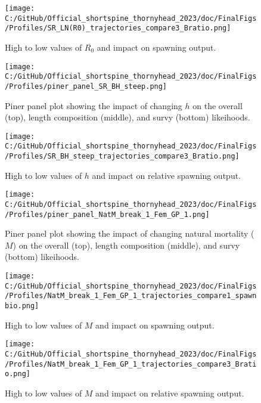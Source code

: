 \documentclass[11pt,
  letterpaper,
]{article}
\begin{document}
\begin{figure}
\centering
\texttt{[image: C:/GitHub/Official\_shortspine\_thornyhead\_2023/doc/FinalFigs/Profiles/SR\_LN(R0)\_trajectories\_compare3\_Bratio.png]}
\caption{High to low values of \(R_0\) and impact on spawning output.\label{fig:R0_spawnout}}
\end{figure}

\begin{figure}
\centering
\texttt{[image: C:/GitHub/Official\_shortspine\_thornyhead\_2023/doc/FinalFigs/Profiles/piner\_panel\_SR\_BH\_steep.png]}
\caption{Piner panel plot showing the impact of changing \(h\) on the overall (top), length composition (middle), and survy (bottom) likeihoods.\label{fig:h_piner_prof}}
\end{figure}

\begin{figure}
\centering
\texttt{[image: C:/GitHub/Official\_shortspine\_thornyhead\_2023/doc/FinalFigs/Profiles/SR\_BH\_steep\_trajectories\_compare3\_Bratio.png]}
\caption{High to low values of \(h\) and impact on relative spawning output.\label{fig:h_spawnout}}
\end{figure}

\begin{figure}
\centering
\texttt{[image: C:/GitHub/Official\_shortspine\_thornyhead\_2023/doc/FinalFigs/Profiles/piner\_panel\_NatM\_break\_1\_Fem\_GP\_1.png]}
\caption{Piner panel plot showing the impact of changing natural mortality (\(M\)) on the overall (top), length composition (middle), and survy (bottom) likeihoods.\label{fig:M_prof}}
\end{figure}

\begin{figure}
\centering
\texttt{[image: C:/GitHub/Official\_shortspine\_thornyhead\_2023/doc/FinalFigs/Profiles/NatM\_break\_1\_Fem\_GP\_1\_trajectories\_compare1\_spawnbio.png]}
\caption{High to low values of \(M\) and impact on spawning output.\label{fig:M_spawnout}}
\end{figure}

\begin{figure}
\centering
\texttt{[image: C:/GitHub/Official\_shortspine\_thornyhead\_2023/doc/FinalFigs/Profiles/NatM\_break\_1\_Fem\_GP\_1\_trajectories\_compare3\_Bratio.png]}
\caption{High to low values of \(M\) and impact on relative spawning output.\label{fig:M_relspawnout}}
\end{figure}
\end{document}
